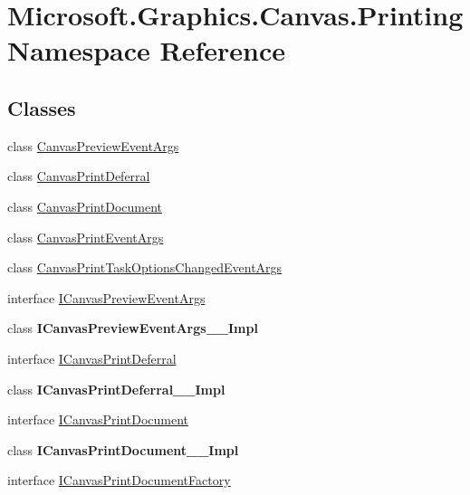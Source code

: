 \hypertarget{namespace_microsoft_1_1_graphics_1_1_canvas_1_1_printing}{}\section{Microsoft.\+Graphics.\+Canvas.\+Printing Namespace Reference}
\label{namespace_microsoft_1_1_graphics_1_1_canvas_1_1_printing}
\subsection*{Classes}
\begin{DoxyCompactItemize}
\item 
class \hyperlink{class_microsoft_1_1_graphics_1_1_canvas_1_1_printing_1_1_canvas_preview_event_args}{Canvas\+Preview\+Event\+Args}
\item 
class \hyperlink{class_microsoft_1_1_graphics_1_1_canvas_1_1_printing_1_1_canvas_print_deferral}{Canvas\+Print\+Deferral}
\item 
class \hyperlink{class_microsoft_1_1_graphics_1_1_canvas_1_1_printing_1_1_canvas_print_document}{Canvas\+Print\+Document}
\item 
class \hyperlink{class_microsoft_1_1_graphics_1_1_canvas_1_1_printing_1_1_canvas_print_event_args}{Canvas\+Print\+Event\+Args}
\item 
class \hyperlink{class_microsoft_1_1_graphics_1_1_canvas_1_1_printing_1_1_canvas_print_task_options_changed_event_args}{Canvas\+Print\+Task\+Options\+Changed\+Event\+Args}
\item 
interface \hyperlink{interface_microsoft_1_1_graphics_1_1_canvas_1_1_printing_1_1_i_canvas_preview_event_args}{I\+Canvas\+Preview\+Event\+Args}
\item 
class {\bfseries I\+Canvas\+Preview\+Event\+Args\+\_\+\+\_\+\+Impl}
\item 
interface \hyperlink{interface_microsoft_1_1_graphics_1_1_canvas_1_1_printing_1_1_i_canvas_print_deferral}{I\+Canvas\+Print\+Deferral}
\item 
class {\bfseries I\+Canvas\+Print\+Deferral\+\_\+\+\_\+\+Impl}
\item 
interface \hyperlink{interface_microsoft_1_1_graphics_1_1_canvas_1_1_printing_1_1_i_canvas_print_document}{I\+Canvas\+Print\+Document}
\item 
class {\bfseries I\+Canvas\+Print\+Document\+\_\+\+\_\+\+Impl}
\item 
interface \hyperlink{interface_microsoft_1_1_graphics_1_1_canvas_1_1_printing_1_1_i_canvas_print_document_factory}{I\+Canvas\+Print\+Document\+Factory}

\end{DoxyCompactItemize}
